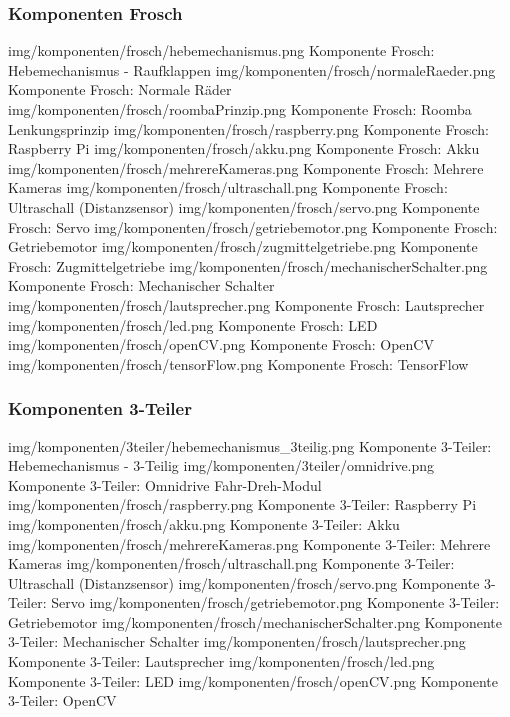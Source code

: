 \subsubsection{Komponenten Frosch}
\image
   {img/komponenten/frosch/hebemechanismus.png}
   {Komponente Frosch: Hebemechanismus - Raufklappen}
\image
   {img/komponenten/frosch/normaleRaeder.png}
   {Komponente Frosch: Normale Räder}
\image
   {img/komponenten/frosch/roombaPrinzip.png}
   {Komponente Frosch: Roomba Lenkungsprinzip}
\image
   {img/komponenten/frosch/raspberry.png}
   {Komponente Frosch: Raspberry Pi}
\image
   {img/komponenten/frosch/akku.png}
   {Komponente Frosch: Akku}
\image
   {img/komponenten/frosch/mehrereKameras.png}
   {Komponente Frosch: Mehrere Kameras}
\image
   {img/komponenten/frosch/ultraschall.png}
   {Komponente Frosch: Ultraschall (Distanzsensor)}
\image
   {img/komponenten/frosch/servo.png}
   {Komponente Frosch: Servo}
\image
   {img/komponenten/frosch/getriebemotor.png}
   {Komponente Frosch: Getriebemotor}
\image
   {img/komponenten/frosch/zugmittelgetriebe.png}
   {Komponente Frosch: Zugmittelgetriebe}
\image
   {img/komponenten/frosch/mechanischerSchalter.png}
   {Komponente Frosch: Mechanischer Schalter}
\image
   {img/komponenten/frosch/lautsprecher.png}
   {Komponente Frosch: Lautsprecher}
\image
   {img/komponenten/frosch/led.png}
   {Komponente Frosch: LED}
\image
   {img/komponenten/frosch/openCV.png}
   {Komponente Frosch: OpenCV}
\image
   {img/komponenten/frosch/tensorFlow.png}
   {Komponente Frosch: TensorFlow}

\subsubsection{Komponenten 3-Teiler}
\image
   {img/komponenten/3teiler/hebemechanismus_3teilig.png}
   {Komponente 3-Teiler: Hebemechanismus - 3-Teilig}
\image
   {img/komponenten/3teiler/omnidrive.png}
   {Komponente 3-Teiler: Omnidrive Fahr-Dreh-Modul}
\image
   {img/komponenten/frosch/raspberry.png}
   {Komponente 3-Teiler: Raspberry Pi}
\image
   {img/komponenten/frosch/akku.png}
   {Komponente 3-Teiler: Akku}
\image
   {img/komponenten/frosch/mehrereKameras.png}
   {Komponente 3-Teiler: Mehrere Kameras}
\image
   {img/komponenten/frosch/ultraschall.png}
   {Komponente 3-Teiler: Ultraschall (Distanzsensor)}
\image
   {img/komponenten/frosch/servo.png}
   {Komponente 3-Teiler: Servo}
\image
   {img/komponenten/frosch/getriebemotor.png}
   {Komponente 3-Teiler: Getriebemotor}
\image
   {img/komponenten/frosch/mechanischerSchalter.png}
   {Komponente 3-Teiler: Mechanischer Schalter}
\image
   {img/komponenten/frosch/lautsprecher.png}
   {Komponente 3-Teiler: Lautsprecher}
\image
   {img/komponenten/frosch/led.png}
   {Komponente 3-Teiler: LED}
\image
   {img/komponenten/frosch/openCV.png}
   {Komponente 3-Teiler: OpenCV}


